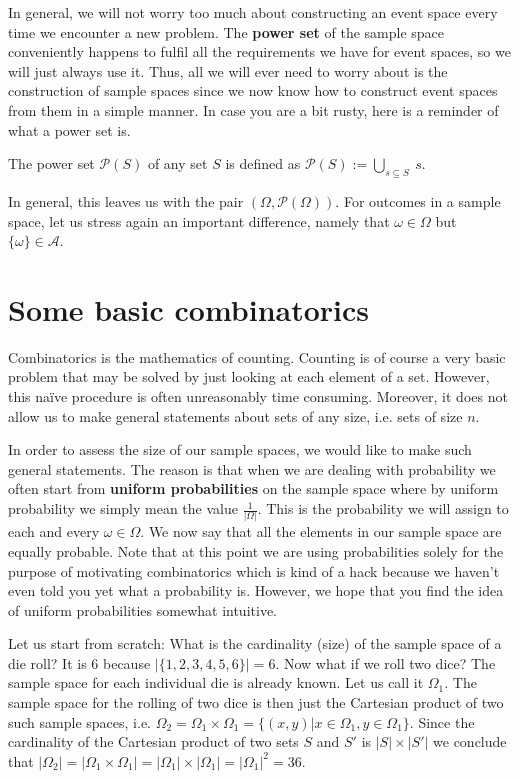 In general, we will not worry too much about constructing an event space every time we encounter a new
problem. The \textbf{power set} of the sample space conveniently happens to fulfil all the requirements
we have for event spaces, so we will just always use it. Thus, all we will ever need to worry about
is the construction of sample spaces since we now know how to construct event spaces from them in a 
simple manner. In case you are a bit rusty, here is a reminder of what a power
set is.

\begin{Definition}
The power set $ \mathcal{P}(S) $ of any set $ S $ is defined as $ \mathcal{P}(S) := \underset{s \subseteq S}{\bigcup}~s $.
\end{Definition}

In general, this leaves us with the pair $ (\Omega, \mathcal{P}(\Omega)) $. For outcomes in a sample space,
let us stress again an important difference, namely that $ \omega \in \Omega $ but 
$ \{\omega\} \in \mathcal{A}$.

\section{Some basic combinatorics}
Combinatorics is the mathematics of counting. Counting is of course a very basic problem that may
be solved by just looking at each element of a set. However, this na\"ive procedure is often
unreasonably time consuming. Moreover, it does not allow us to make general statements about sets of any 
size, i.e. sets of size $ n $.

In order to assess the size of our sample spaces, we would like to make such general statements. The reason
is that when we are dealing with probability we often start from \textbf{uniform probabilities} 
on the sample space where by uniform probability we simply mean the value $ \frac{1}{|\Omega|} $. This
is the probability we will assign to each and every $ \omega \in \Omega $. We now say that all the
elements in our sample space are equally probable. 
Note that at this point we are using probabilities solely for the purpose of motivating combinatorics which
is kind of a hack because we haven't even told you yet what a probability is. However, we hope that you
find the idea of uniform probabilities somewhat intuitive. 

Let us start from scratch: What is the cardinality (size) of the sample space of a die roll? It
is $ 6 $ because $ |\{1,2,3,4,5,6\}| = 6 $. Now what if we roll two dice? The sample space for each 
individual die is already known. Let us call it $ \Omega_{1} $. The sample space for the rolling of two dice
is then just the Cartesian product of two such sample spaces, i.e.
$ \Omega_{2} = \Omega_{1} \times \Omega_{1} = \{(x,y)|x \in \Omega_{1}, y \in \Omega_{1}\} $. Since
the cardinality of the Cartesian product of two sets $ S $ and $ S' $ is $ |S| \times |S'| $ we conclude
that $ |\Omega_{2}| = |\Omega_{1} \times \Omega_{1}| = |\Omega_{1}| \times |\Omega_{1}| 
= |\Omega_{1}|^{2} = 36 $.

